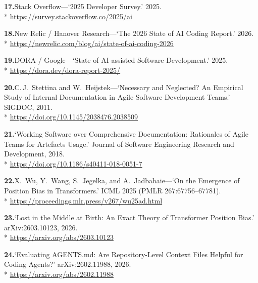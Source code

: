 \documentclass[11pt, a4paper]{article}
\begin{document}
\noindent\textbf{17.}\enspace Stack Overflow---`2025 Developer Survey.' 2025.\\*
{\fontsize{8}{10}\selectfont\color{midb}
\href{https://survey.stackoverflow.co/2025/ai}{https://survey.stackoverflow.co/2025/ai}}


\noindent\textbf{18.}\enspace New Relic / Hanover Research---`The 2026 State of AI
Coding Report.' 2026.\\*
{\fontsize{8}{10}\selectfont\color{midb}
\href{https://newrelic.com/blog/ai/state-of-ai-coding-2026}{https://newrelic.com/blog/ai/state-of-ai-coding-2026}}


\noindent\textbf{19.}\enspace DORA / Google---`State of AI-assisted Software
Development.' 2025.\\*
{\fontsize{8}{10}\selectfont\color{midb}
\href{https://dora.dev/dora-report-2025/}{https://dora.dev/dora-report-2025/}}


\noindent\textbf{20.}\enspace C.\,J.~Stettina and W.~Heijstek---`Necessary and Neglected?
An Empirical Study of Internal Documentation in Agile Software Development Teams.'
SIGDOC, 2011.\\*
{\fontsize{8}{10}\selectfont\color{midb}
\href{https://doi.org/10.1145/2038476.2038509}{https://doi.org/10.1145/2038476.2038509}}


\noindent\textbf{21.}\enspace `Working Software over Comprehensive Documentation:
Rationales of Agile Teams for Artefacts Usage.' Journal of Software Engineering Research
and Development, 2018.\\*
{\fontsize{8}{10}\selectfont\color{midb}
\href{https://doi.org/10.1186/s40411-018-0051-7}{https://doi.org/10.1186/s40411-018-0051-7}}


\noindent\textbf{22.}\enspace X.~Wu, Y.~Wang, S.~Jegelka, and A.~Jadbabaie---`On the
Emergence of Position Bias in Transformers.' ICML 2025 (PMLR 267:67756--67781).\\*
{\fontsize{8}{10}\selectfont\color{midb}
\href{https://proceedings.mlr.press/v267/wu25ad.html}{https://proceedings.mlr.press/v267/wu25ad.html}}


\noindent\textbf{23.}\enspace `Lost in the Middle at Birth: An Exact Theory of Transformer
Position Bias.' arXiv:2603.10123, 2026.\\*
{\fontsize{8}{10}\selectfont\color{midb}
\href{https://arxiv.org/abs/2603.10123}{https://arxiv.org/abs/2603.10123}}


\noindent\textbf{24.}\enspace `Evaluating AGENTS.md: Are Repository-Level Context Files
Helpful for Coding Agents?' arXiv:2602.11988, 2026.\\*
{\fontsize{8}{10}\selectfont\color{midb}
\href{https://arxiv.org/abs/2602.11988}{https://arxiv.org/abs/2602.11988}}
\end{document}
